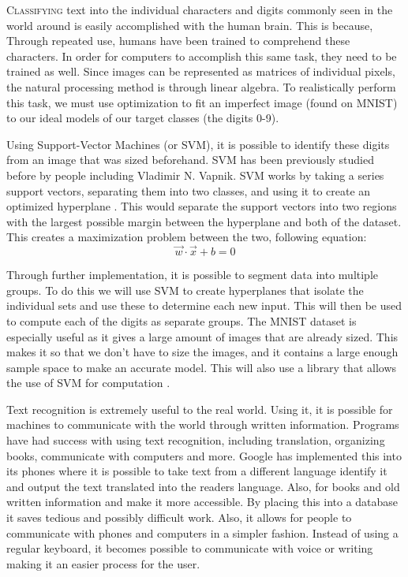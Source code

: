 \lettrine[nindent=0em,lines=3]{C}{lassifying} text into the individual characters and digits commonly seen in the world around is easily accomplished with the human brain. This is because, Through repeated use, humans have been trained to comprehend these characters. In order for computers to accomplish this same task, they need to be trained as well. Since images can be represented as matrices of individual pixels, the natural processing method is through linear algebra. To realistically perform this task, we must use optimization to fit an imperfect image (found on MNIST) to our ideal models of our target classes (the digits 0-9).

Using Support-Vector Machines (or SVM), it is possible to identify these digits from an image that was sized beforehand. SVM has been previously studied before by people including Vladimir N. Vapnik. SVM works by taking a series support vectors, separating them into two classes, and using it to create an optimized hyperplane \cite{statistical-learning}. This would separate the support vectors into two regions with the largest possible margin between the hyperplane and both of the dataset. This creates a maximization problem between the two, following equation:
\begin{equation}
  \vec{w} \cdot \vec{x}+b=0
\end{equation}

Through further implementation, it is possible to segment data into multiple groups. To do this we will use SVM to create hyperplanes that isolate the individual sets and use these to determine each new input. This will then be used to compute each of the digits as separate groups.  The MNIST dataset is especially useful as it gives a large amount of images that are already sized. This makes it so that we don't have to size the images, and it contains a large enough sample space to make an accurate model. This will also use a library that allows the use of SVM for computation \cite{scikit-learn}.

Text recognition is extremely useful to the real world. Using it, it is possible for machines to communicate with the world through written information. Programs have had success with using text recognition, including translation, organizing books, communicate with computers and more. Google has implemented this into its phones where it is possible to take text from a different language identify it and output the text translated into the readers language. Also, for books and old written information and make it more accessible. By placing this into a database it saves tedious and possibly difficult work. Also, it allows for people to communicate with phones and computers in a simpler fashion. Instead of using a regular keyboard, it becomes possible to communicate with voice or writing making it an easier process for the user.